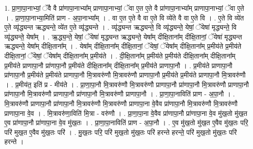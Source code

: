 \documentclass[17pt]{extarticle}
\begin{document}
1. प्रा॒णा॒पा॒नाभ्यां॒ ॅवै वै प्रा॑णापा॒नाभ्या᳚म् प्राणापा॒नाभ्यां॒ ॅवा ए॒त ए॒ते वै प्रा॑णापा॒नाभ्या᳚म् प्राणापा॒नाभ्यां॒ ॅवा ए॒ते । . प्रा॒णा॒पा॒नाभ्या॒मिति॑ प्राण - अ॒पा॒नाभ्या᳚म् । . वा ए॒त ए॒ते वै वा ए॒ते वि व्ये॑ते वै वा ए॒ते वि । . ए॒ते वि व्ये॑त ए॒ते व्यृ॑द्ध्यन्त ऋद्ध्यन्ते॒ व्ये॑त ए॒ते व्यृ॑द्ध्यन्ते । . व्यृ॑द्ध्यन्त ऋद्ध्यन्ते॒ वि व्यृ॑द्ध्यन्ते॒ येषां॒ ॅयेषा॑ मृद्ध्यन्ते॒ वि व्यृ॑द्ध्यन्ते॒ येषा᳚म् । . ऋ॒द्ध्य॒न्ते॒ येषां॒ ॅयेषा॑ मृद्ध्यन्त ऋद्ध्यन्ते॒ येषा᳚म् दीक्षि॒ताना᳚म् दीक्षि॒तानां॒ ॅयेषा॑ मृद्ध्यन्त ऋद्ध्यन्ते॒ येषा᳚म् दीक्षि॒ताना᳚म् । . येषा᳚म् दीक्षि॒ताना᳚म् दीक्षि॒तानां॒ ॅयेषां॒ ॅयेषा᳚म् दीक्षि॒ताना᳚म् प्र॒मीय॑ते प्र॒मीय॑ते दीक्षि॒तानां॒ ॅयेषां॒ ॅयेषा᳚म् दीक्षि॒ताना᳚म् प्र॒मीय॑ते । . दी॒क्षि॒ताना᳚म् प्र॒मीय॑ते प्र॒मीय॑ते दीक्षि॒ताना᳚म् दीक्षि॒ताना᳚म् प्र॒मीय॑ते प्राणापा॒नौ प्रा॑णापा॒नौ प्र॒मीय॑ते दीक्षि॒ताना᳚म् दीक्षि॒ताना᳚म् प्र॒मीय॑ते प्राणापा॒नौ । . प्र॒मीय॑ते प्राणापा॒नौ प्रा॑णापा॒नौ प्र॒मीय॑ते प्र॒मीय॑ते प्राणापा॒नौ मि॒त्रावरु॑णौ मि॒त्रावरु॑णौ प्राणापा॒नौ प्र॒मीय॑ते प्र॒मीय॑ते प्राणापा॒नौ मि॒त्रावरु॑णौ । . प्र॒मीय॑त॒ इति॑ प्र - मीय॑ते । . प्रा॒णा॒पा॒नौ मि॒त्रावरु॑णौ मि॒त्रावरु॑णौ प्राणापा॒नौ प्रा॑णापा॒नौ मि॒त्रावरु॑णौ प्राणापा॒नौ प्रा॑णापा॒नौ मि॒त्रावरु॑णौ प्राणापा॒नौ प्रा॑णापा॒नौ मि॒त्रावरु॑णौ प्राणापा॒नौ । . प्रा॒णा॒पा॒नाविति॑ प्राण - अ॒पा॒नौ । . मि॒त्रावरु॑णौ प्राणापा॒नौ प्रा॑णापा॒नौ मि॒त्रावरु॑णौ मि॒त्रावरु॑णौ प्राणापा॒ना वे॒वैव प्रा॑णापा॒नौ मि॒त्रावरु॑णौ मि॒त्रावरु॑णौ प्राणापा॒ना वे॒व । . मि॒त्रावरु॑णा॒विति॑ मि॒त्रा - वरु॑णौ । . प्रा॒णा॒पा॒ना वे॒वैव प्रा॑णापा॒नौ प्रा॑णापा॒ना वे॒व मु॑ख॒तो मु॑ख॒त ए॒व प्रा॑णापा॒नौ प्रा॑णापा॒ना वे॒व मु॑ख॒तः । . प्रा॒णा॒पा॒नाविति॑ प्राण - अ॒पा॒नौ । . ए॒व मु॑ख॒तो मु॑ख॒त ए॒वैव मु॑ख॒तः परि॒ परि॑ मुख॒त ए॒वैव मु॑ख॒तः परि॑ । . मु॒ख॒तः परि॒ परि॑ मुख॒तो मु॑ख॒तः परि॑ हरन्ते हरन्ते॒ परि॑ मुख॒तो मु॑ख॒तः परि॑ हरन्ते । \newline
\end{document}
